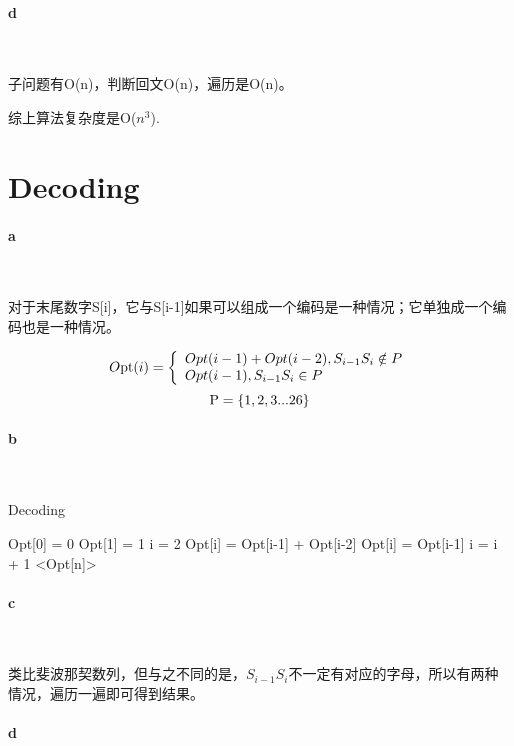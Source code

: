 \documentclass{article}
\begin{document}
		\paragraph{d}\
		
		子问题有O(n)，判断回文O(n)，遍历是O(n)。
		
		综上算法复杂度是O(${n^3}$).
		
	\newpage
	\section{Decoding}
		\paragraph{a}\
		
		对于末尾数字S[i]，它与S[i-1]如果可以组成一个编码是一种情况；它单独成一个编码也是一种情况。
		
		\[O{\rm{pt}}(i) = \left\{ {\begin{array}{*{20}{l}}
			{Opt(i - 1) + Opt(i - 2) , {S_{i - 1}}{S_i} \notin P}\\
			{Opt(i - 1) , {S_{i - 1}}{S_i} \in P}
			\end{array}} \right.\]
		\[{\rm{P = \{ }}1,2,3...26{\rm{\} }}\]
		
		
		\paragraph{b}\
		\begin{algorithm}
			\caption{Decoding}
			\begin{algorithmic}
				\State Opt[0] = 0
				\State Opt[1] = 1
				\State i = 2
				\State Opt[i] = Opt[i-1] + Opt[i-2]
				\Else
				\State Opt[i] = Opt[i-1]
				\EndIf
				\State i = i + 1
				\EndFor
				\State
				\Return <Opt[n]>
				\EndProcedure
			\end{algorithmic}
		\end{algorithm}
	
		\paragraph{c}\
		
			类比斐波那契数列，但与之不同的是，${S_{i - 1}}{S_i}$不一定有对应的字母，所以有两种情况，遍历一遍即可得到结果。
		\paragraph{d}\
		
\end{document}
